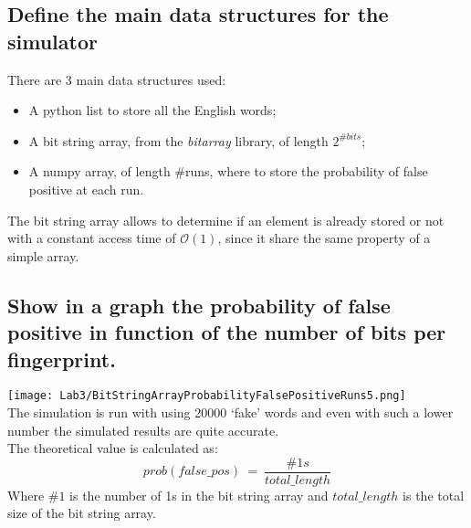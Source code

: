 \documentclass[twocolumn,letterpaper]{report}
\begin{document}
{			\subsection{Define the main data structures for the simulator}
						There are 3 main data structures used: 
							\begin{itemize}
								\item A python list to store all the English words;
								\item A bit string array,  from the \emph{bitarray} library, of length $2^{\#bits}$;
								\item A numpy array, of length \#runs, where to store the probability of false positive at each run.
							\end{itemize}
					The bit string array allows to determine if an element is already stored or not with a constant access time of $\mathcal{O}(1)$, since it share the same property of a simple array.
					
			\subsection{Show in a graph the probability of false positive in function of the number of bits per fingerprint.}
			\texttt{[image: Lab3/BitStringArrayProbabilityFalsePositiveRuns5.png]} \\
			The simulation is run with using 20000 `fake' words and even with such a lower number the simulated results are quite accurate. \\
			The theoretical value is calculated as:
			\begin{equation}\label{eq:1}
						prob(false\_pos) \: = \: \frac{\#1s}{total\_length}
			\end{equation}
			Where $\#1$ is the number of 1s in the bit string array and $total\_length$ is the total size of the bit string array.
			
			
			
}
\end{document}
